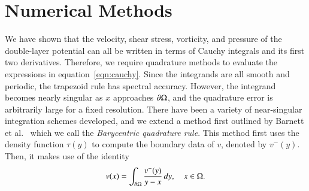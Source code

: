\documentclass[preprint, 10pt]{elsarticle}
\begin{document}
\section{Numerical Methods}
\label{s:method}
We have shown that the velocity, shear stress, vorticity, and pressure
of the double-layer potential can all be written in terms of Cauchy
integrals and its first two derivatives.  Therefore, we require
quadrature methods to evaluate the expressions in
equation~\eqref{eqn:cauchy}.  Since the integrands are all smooth and
periodic, the trapezoid rule has spectral accuracy.  However, the
integrand becomes nearly singular as $x$ approaches ${\partial}\Omega$, and the
quadrature error is arbitrarily large for a fixed resolution.  There
have been a variety of near-singular integration schemes developed, and
we extend a method first outlined by Barnett et
al.~\cite{bar-wu-vee2015} which we call the {\em Barycentric quadrature
rule}.  This method first uses the density function $\tau(y)$ to compute
the boundary data of $v$, denoted by $v^-(y)$.  Then, it makes use of
the identity
\begin{align}
  v(x) = \int_{{\partial}\Omega} \frac{v^{-}(y)}{y-x} \, dy, 
  \quad x \in \Omega.
\end{align}
\end{document}
